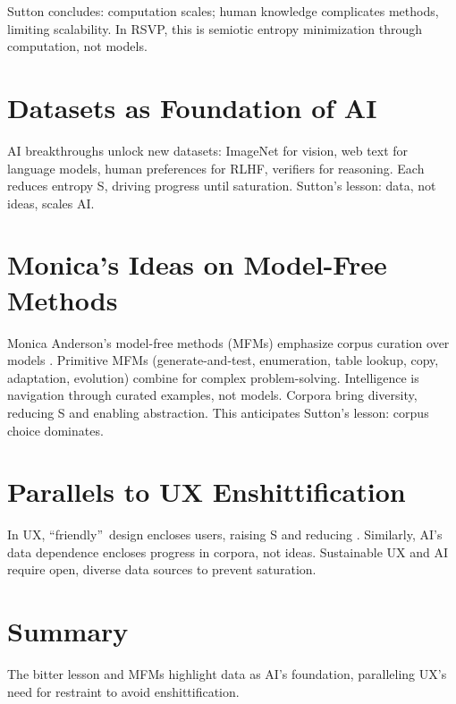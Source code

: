 \documentclass[openany]{book}
\newcommand{\Auton}{\mathcal{A}} %
\begin{document}
Sutton concludes: computation scales; human knowledge complicates methods, limiting scalability. In RSVP, this is semiotic entropy minimization through computation, not models.

\section{Datasets as Foundation of AI}
\label{sec:datasets-foundation}
AI breakthroughs unlock new datasets: ImageNet for vision, web text for language models, human preferences for RLHF, verifiers for reasoning. Each reduces entropy S, driving progress until saturation. Sutton's lesson: data, not ideas, scales AI.

\section{Monica's Ideas on Model-Free Methods}
\label{sec:monica-mfm}
Monica Anderson's model-free methods (MFMs) emphasize corpus curation over models \citep{anderson2014}. Primitive MFMs (generate-and-test, enumeration, table lookup, copy, adaptation, evolution) combine for complex problem-solving. Intelligence is navigation through curated examples, not models. Corpora bring diversity, reducing S and enabling abstraction. This anticipates Sutton's lesson: corpus choice dominates.

\section{Parallels to UX Enshittification}
\label{sec:ai-ux-parallels}
In UX, \textquotedblleft friendly\textquotedblright\ design encloses users, raising S and reducing \Auton{}. Similarly, AI's data dependence encloses progress in corpora, not ideas. Sustainable UX and AI require open, diverse data sources to prevent saturation.

\section{Summary}
The bitter lesson and MFMs highlight data as AI's foundation, paralleling UX's need for restraint to avoid enshittification.


\end{document}
